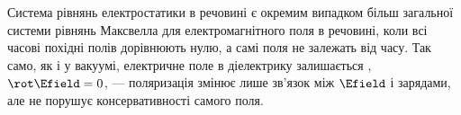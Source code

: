 \begin{Attention}
	Система рівнянь електростатики в речовині є окремим випадком більш загальної системи рівнянь Максвелла для електромагнітного поля в
	речовині, коли всі часові похідні полів дорівнюють нулю, а самі поля не залежать від часу. Так само, як і у вакуумі, електричне поле в
	діелектрику залишається , $\rot\Efield = 0$, --- поляризація змінює лише зв'язок між $\Efield$ і зарядами, але не порушує
	консервативності самого поля.
\end{Attention}